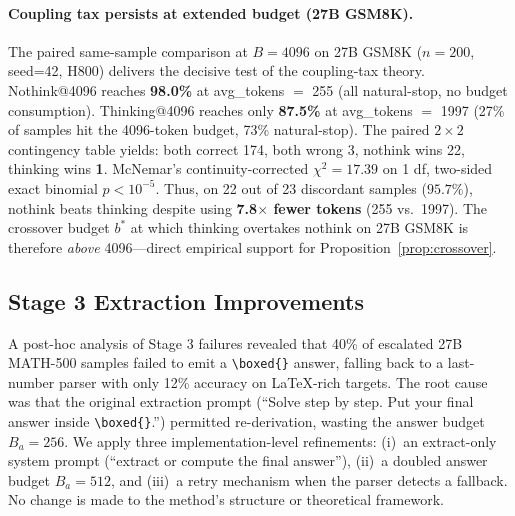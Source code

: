 \paragraph{Coupling tax persists at extended budget (27B GSM8K).}
The paired same-sample comparison at $B{=}4096$ on 27B GSM8K ($n{=}200$, seed=42, H800) delivers the decisive test of the coupling-tax theory.
Nothink@4096 reaches \textbf{98.0\%} at avg\_tokens $=$ 255 (all natural-stop, no budget consumption).
Thinking@4096 reaches only \textbf{87.5\%} at avg\_tokens $=$ 1997 (27\% of samples hit the 4096-token budget, 73\% natural-stop).
The paired $2{\times}2$ contingency table yields: both correct 174, both wrong 3, nothink wins 22, thinking wins \textbf{1}.
McNemar's continuity-corrected $\chi^2 = 17.39$ on 1 df, two-sided exact binomial $p < 10^{-5}$.
Thus, on 22 out of 23 discordant samples ($95.7\%$), nothink beats thinking despite using \textbf{7.8$\times$ fewer tokens} (255 vs.\ 1997).
The crossover budget $b^*$ at which thinking overtakes nothink on 27B GSM8K is therefore \emph{above} 4096---direct empirical support for Proposition~\ref{prop:crossover}.

\subsection{Stage 3 Extraction Improvements}
\label{sec:experiments:improved}

A post-hoc analysis of Stage 3 failures revealed that 40\% of escalated 27B MATH-500 samples failed to emit a \texttt{\textbackslash boxed\{\}} answer, falling back to a last-number parser with only 12\% accuracy on LaTeX-rich targets.
The root cause was that the original extraction prompt (``Solve step by step. Put your final answer inside \texttt{\textbackslash boxed\{\}}.'') permitted re-derivation, wasting the answer budget $B_a{=}256$.
We apply three implementation-level refinements: (i)~an extract-only system prompt (``extract or compute the final answer''), (ii)~a doubled answer budget $B_a{=}512$, and (iii)~a retry mechanism when the parser detects a fallback.
No change is made to the method's structure or theoretical framework.

